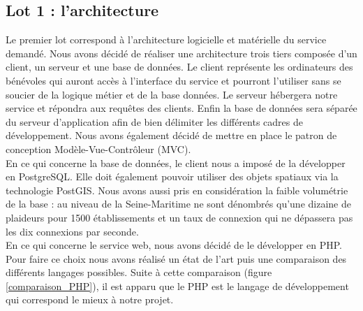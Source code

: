 \documentclass[asi]{picInsa}
\begin{document}
\subsection{Lot 1 : l'architecture}
Le premier lot correspond à l'architecture logicielle et matérielle du service demandé. Nous avons décidé de réaliser une architecture trois tiers composée d'un client, un serveur et une base de données. Le client représente les ordinateurs des bénévoles qui auront accès à l'interface du service et pourront l'utiliser sans se soucier de la logique métier et de la base données. Le serveur hébergera notre service et répondra aux requêtes des clients. Enfin la base de données sera séparée du serveur d'application afin de bien délimiter les différents cadres de développement. Nous avons également décidé de mettre en place le patron de conception Modèle-Vue-Contrôleur (MVC).\vspace{0.5cm}\\
En ce qui concerne la base de données, le client nous a imposé de la développer en PostgreSQL. Elle doit également pouvoir utiliser des objets spatiaux via la technologie PostGIS. Nous avons aussi pris en considération la faible volumétrie de la base : au niveau de la Seine-Maritime ne sont dénombrés qu'une dizaine de plaideurs pour 1500 établissements et un taux de connexion qui ne dépassera pas les dix connexions par seconde.\vspace{0.5cm}\\
En ce qui concerne le service web, nous avons décidé de le développer en PHP. Pour faire ce choix nous avons réalisé un état de l'art puis une comparaison des différents langages possibles. Suite à cette comparaison (figure \ref{comparaison_PHP}), il est apparu que le PHP est le langage de développement qui correspond le mieux à notre projet.
\end{document}
